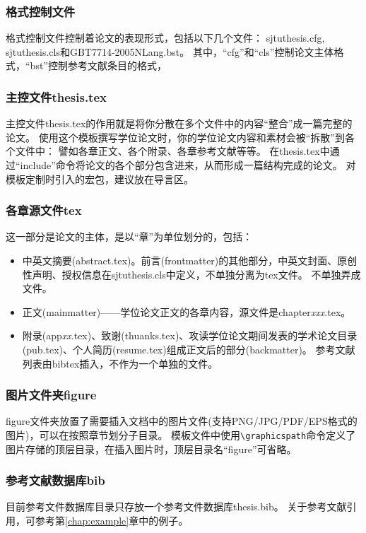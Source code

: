 \subsubsection{格式控制文件}
\label{sec:format}

格式控制文件控制着论文的表现形式，包括以下几个文件：
sjtuthesis.cfg, sjtuthesis.cls和GBT7714-2005NLang.bst。
其中，“cfg”和“cls”控制论文主体格式，“bst”控制参考文献条目的格式，

\subsubsection{主控文件thesis.tex}
\label{sec:thesistex}

主控文件thesis.tex的作用就是将你分散在多个文件中的内容“整合”成一篇完整的论文。
使用这个模板撰写学位论文时，你的学位论文内容和素材会被“拆散”到各个文件中：
譬如各章正文、各个附录、各章参考文献等等。
在thesis.tex中通过“include”命令将论文的各个部分包含进来，从而形成一篇结构完成的论文。
对模板定制时引入的宏包，建议放在导言区。

\subsubsection{各章源文件tex}
\label{sec:thesisbody}

这一部分是论文的主体，是以“章”为单位划分的，包括：

\begin{itemize}[noitemsep,topsep=0pt,parsep=0pt,partopsep=0pt]
	\item 中英文摘要(abstract.tex)。前言(frontmatter)的其他部分，中英文封面、原创性声明、授权信息在sjtuthesis.cls中定义，不单独分离为tex文件。
不单独弄成文件。
	\item 正文(mainmatter)——学位论文正文的各章内容，源文件是chapter\emph{xxx}.tex。
	\item 附录(app\emph{xx}.tex)、致谢(thuanks.tex)、攻读学位论文期间发表的学术论文目录(pub.tex)、个人简历(resume.tex)组成正文后的部分(backmatter)。
参考文献列表由bibtex插入，不作为一个单独的文件。
\end{itemize}

\subsubsection{图片文件夹figure}
\label{sec:fig}

figure文件夹放置了需要插入文档中的图片文件(支持PNG/JPG/PDF/EPS格式的图片)，可以在按照章节划分子目录。
模板文件中使用\verb|\graphicspath|命令定义了图片存储的顶层目录，在插入图片时，顶层目录名“figure”可省略。

\subsubsection{参考文献数据库bib}
\label{sec:bib}

目前参考文件数据库目录只存放一个参考文件数据库thesis.bib。
关于参考文献引用，可参考第\ref{chap:example}章中的例子。


